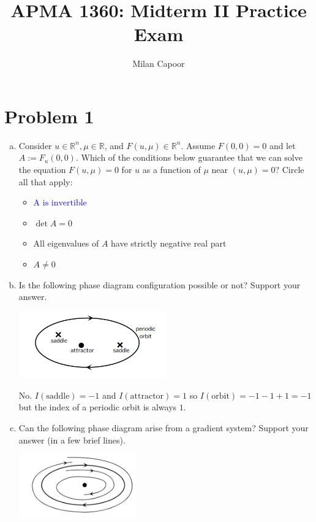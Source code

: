 \documentclass[12pt]{article}
\title{APMA 1360: Midterm II Practice Exam}
\author{Milan Capoor}
\date{}
\newcommand{\R}{\mathbb{R}}
\begin{document}
\maketitle

\section{Problem 1}

\begin{enumerate}[(a)]
    \item Consider $u \in \R^n, \mu \in \R$, and $F(u, \mu) \in \R^n$. Assume $F(0,0) = 0$ and let $A := F_u(0,0)$. Which of the conditions below guarantee that we can solve the equation $F(u, \mu) = 0$ for $u$ as a function of $\mu$ near $(u,\mu) = 0$? Circle all that apply:
          \begin{itemize}
              \item \textcolor{blue}{$\boxed{\text{A is invertible}}$}
              \item $\det A = 0$
              \item All eigenvalues of $A$ have strictly negative real part
              \item $A \neq 0$
          \end{itemize}

    \item Is the following phase diagram configuration possible or not? Support your answer.

          \begin{center}
              \includegraphics[width=0.5\textwidth]{1b.png}
          \end{center}

          \color{blue}
          No. $I(\text{saddle}) = -1$ and $I(\text{attractor}) = 1$ so $I(\text{orbit}) = -1 -1 + 1 = -1$ but the index of a periodic orbit is always $1$.
          \color{black}


    \item Can the following phase diagram arise from a gradient system? Support your answer (in a few
          brief lines).

          \begin{center}
              \includegraphics[width=0.4\textwidth]{1c.png}
          \end{center}


\end{enumerate}
\end{document}
